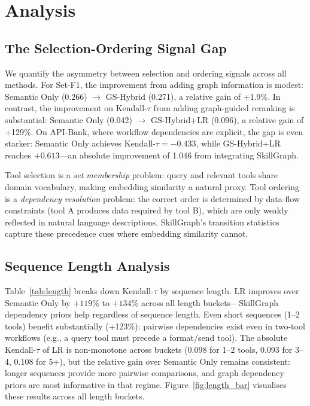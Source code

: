 \documentclass[lettersize,journal]{IEEEtran}
\begin{document}


\section{Analysis}
\label{sec:analysis}

\subsection{The Selection-Ordering Signal Gap}

We quantify the asymmetry between selection and ordering signals across all methods.
For Set-F1, the improvement from adding graph information is modest: Semantic Only (0.266) $\to$ GS-Hybrid (0.271), a relative gain of +1.9\%.
In contrast, the improvement on Kendall-$\tau$ from adding graph-guided reranking is substantial: Semantic Only (0.042) $\to$ GS-Hybrid+LR (0.096), a relative gain of +129\%.
On API-Bank, where workflow dependencies are explicit, the gap is even starker: Semantic Only achieves Kendall-$\tau = -0.433$, while GS-Hybrid+LR reaches $+0.613$---an absolute improvement of 1.046 from integrating SkillGraph.

Tool selection is a \emph{set membership} problem: query and relevant tools share domain vocabulary, making embedding similarity a natural proxy.
Tool ordering is a \emph{dependency resolution} problem: the correct order is determined by data-flow constraints (tool A produces data required by tool B), which are only weakly reflected in natural language descriptions.
SkillGraph's transition statistics capture these precedence cues where embedding similarity cannot.

\subsection{Sequence Length Analysis}



Table~\ref{tab:length} breaks down Kendall-$\tau$ by sequence length.
LR improves over Semantic Only by $+119\%$ to $+134\%$ across all length buckets---SkillGraph dependency priors help regardless of sequence length.
Even short sequences (1--2 tools) benefit substantially (+123\%): pairwise dependencies exist even in two-tool workflows (e.g., a query tool must precede a format/send tool).
The absolute Kendall-$\tau$ of LR is non-monotone across buckets (0.098 for 1--2 tools, 0.093 for 3--4, 0.108 for 5+), but the relative gain over Semantic Only remains consistent: longer sequences provide more pairwise comparisons, and graph dependency priors are most informative in that regime.
Figure~\ref{fig:length_bar} visualises these results across all length buckets.
\end{document}
